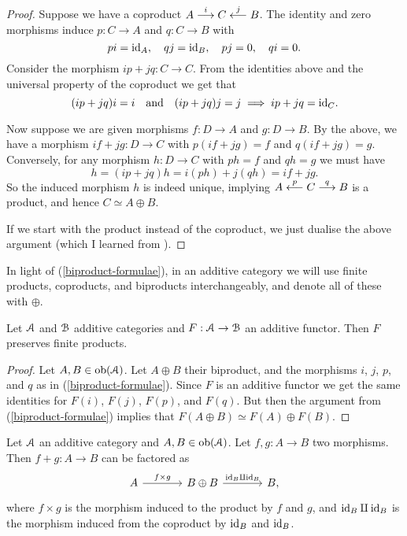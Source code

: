 \begin{proof}
  Suppose we have a coproduct $A \overset{i}{\longrightarrow} C
  \overset{j}{\longleftarrow} B$. The identity and zero morphisms induce $p
  : C \to A$ and $q : C \to B$ with
  \[
  pi = \mathrm{id}_A, \quad qj = \mathrm{id}_B, \quad pj = 0, \quad qi = 0.
  \]
  Consider the morphism $ip + jq : C \to C$. From the identities above
  and the universal property of the coproduct we get that
  \[
  (ip + jq)i = i \quad\text{and}\quad (ip+jq)j = j \implies ip+jq =
  \mathrm{id}_C.
  \]

  \medskip
  Now suppose we are given morphisms $f : D \to A$ and $g : D \to
  B$. By the above, we have a morphism $if + jg : D \to C$ with
  $p(if+jg) = f$ and $q(if+jg) = g$. Conversely, for any morphism $h :
  D \to C$ with $ph = f$ and $qh = g$ we must have
  \[
  h = (ip+jq)h = i(ph) + j(qh) = if + jg.
  \]
  So the induced morphism $h$ is indeed unique, implying $A
  \overset{p}{\longleftarrow} C \overset{q}{\longrightarrow} B$ is a product, and
  hence $C \simeq A \oplus B$.

  \medskip
  If we start with the product instead of the coproduct, we just
  dualise the above argument (which I learned from
  \cite{mo-additive-functor-direct-sum}).
\end{proof}


\begin{notation}
  In light of (\ref{biproduct-formulae}), in an additive category we
  will use finite products, coproducts, and biproducts
  interchangeably, and denote all of these with $\oplus$.
\end{notation}

\begin{lemma}
  \label{additive-functor-preserves-products}
  Let $\mathcal{A}$ and $\mathcal{B}$ additive categories and $F : \mathcal{A} \to \mathcal{B}$ an
  additive functor. Then $F$ preserves finite products.
\end{lemma}

\begin{proof}
  Let $A,B \in \operatorname{ob}(\mathcal{A})$. Let $A \oplus B$ their biproduct, and the
  morphisms $i$, $j$, $p$, and $q$ as in
  (\ref{biproduct-formulae}). Since $F$ is an additive functor we get
  the same identities for $F(i)$, $F(j)$, $F(p)$, and $F(q)$.  But
  then the argument from (\ref{biproduct-formulae}) implies that $F(A
  \oplus B) \simeq F(A) \oplus F(B)$.
\end{proof}

\begin{lemma}
  \label{sum-factor}
  Let $\mathcal{A}$ an additive category and $A,B \in \operatorname{ob}(\mathcal{A})$. Let $f,g : A
  \to B$ two morphisms. Then $f + g : A \to B$ can be factored as
  \[
  \begin{tikzcd}[column sep = large]
    A \rar{f \times g} & B \oplus B \rar{\id_B \amalg \id_B} & B,
  \end{tikzcd}
  \]
  where $f \times g$ is the morphism induced to the product by $f$ and
  $g$, and $\mathrm{id}_B \amalg \mathrm{id}_B$ is the morphism induced from the
  coproduct by $\mathrm{id}_B$ and $\mathrm{id}_B$.
\end{lemma}

